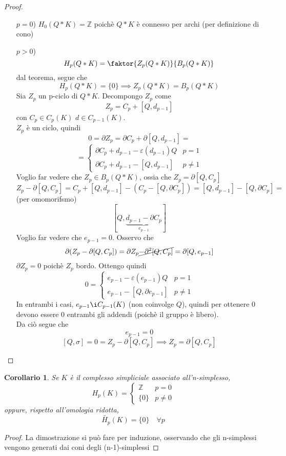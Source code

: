 \documentclass[a4paper]{report}
\newtheorem{corollary}{Corollario}
\newcommand{\Z}{\ensuremath{\mathbb{Z}}}
\begin{document}
\begin{proof}
    \begin{itemize}
        \item [$p=0$)] $H_0(Q*K)=\Z$ poichè $Q*K$ è connesso per archi (per definizione di cono)
        \item [$p>0$)]
        \[
            H_p(Q*K)=\faktor{Z_p(Q*K)}{B_p(Q*K)}    
        \]
        dal teorema, segue che
        \[
            H_p(Q*K)=\{0\}\implies Z_p(Q*K)=B_p(Q*K)    
        \]
        Sia $Z_p$ un p-ciclo di $Q*K$. Decompongo $Z_p$ come
        \[
            Z_p=C_p+[Q,d_{p-1}]    
        \]
        con $C_p\in C_p(K)$ $d\in C_{p-1}(K)$.\\
        $Z_p$ è un ciclo, quindi
        \[
            0=\partial Z_p=\partial C_p+\partial[Q,d_{p-1}]= 
        \]
        \[
            =\begin{cases}
                \partial C_p+d_{p-1}-\varepsilon(d_{p-1})Q & p=1\\
                \partial C_p+d_{p-1}-[Q,d_{p-1}] & p\neq 1
            \end{cases}    
        \]
        Voglio far vedere che $Z_p\in B_p(Q*K)$, ossia che $Z_p=\partial[Q,C_p]$
        \[
            Z_p-\partial[Q,C_p]=C_p+[Q,d_{p-1}]-(C_p-[Q,\partial C_p])=[Q,d_{p-1}]-[Q,\partial C_p]=
        \]
        (per omomorifsmo)
        \[
            [Q,\underbrace{d_{p-1}-\partial C_p}_{e_{p-1}}]
        \]
        Voglio far vedere che $e_{p-1}=0$. Osservo che
        \[
            \partial(Z_p-\partial[Q,C_p])=\partial Z_p\cancel{-\partial^2[Q,C_p]}=\partial[Q,e_{p-1}]    
        \]
        $\partial Z_p=0$ poichè $Z_p$ bordo. Ottengo quindi
        \[
            0=\begin{cases}
                e_{p-1}-\varepsilon(e_{p-1})Q & p=1\\
                e_{p-1}-[Q,\partial e_{p-1}] & p\neq 1
            \end{cases}
        \]
        In entrambi i casi, $e_{p-1}\i C_{p-1}(K)$ (non coinvolge $Q$), quindi per ottenere $0$ devono essere 0 entrambi gli addendi (poichè il gruppo è libero).\\
        Da ciò segue che
        \[
            e_{p-1}=0    
        \]
        \[
            [Q,\sigma]=0=Z_p-\partial[Q,C_p]\implies Z_p=\partial[Q,C_p]    
        \]
    \end{itemize}
\end{proof}
\begin{corollary}
    Se $K$ è il complesso simpliciale associato all'n-simplesso,
    \[
        H_p(K)=\begin{cases}
            \Z & p=0\\
            \{0\} & p\neq 0
        \end{cases}    
    \]
    oppure, rispetto all'omologia ridotta,
    \[
        \tilde{H_p}(K)=\{0\}\quad \forall p
    \]
\end{corollary}
\begin{proof}
    La dimostrazione si può fare per induzione, osservando che gli n-simplessi vengono generati dai coni degli (n-1)-simplessi
\end{proof}
\end{document}

